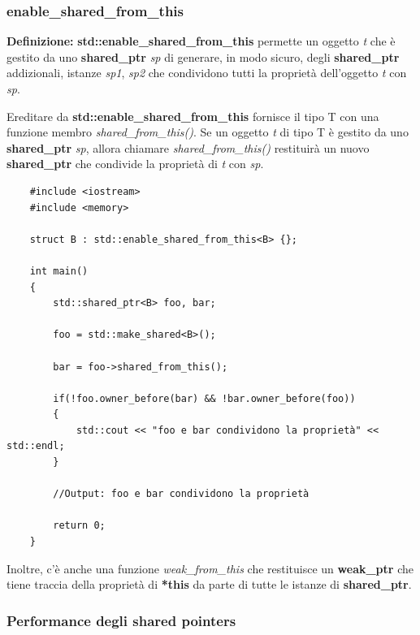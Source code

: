 
\subsubsection{enable\_shared\_from\_this}

\textsf{\small \textbf{Definizione: } \textbf{std::enable\_shared\_from\_this} permette un oggetto \emph{t} che è gestito da uno \textbf{shared\_ptr} \emph{sp} di generare, in modo sicuro, degli \textbf{shared\_ptr} addizionali, istanze \emph{sp1}, \emph{sp2} che condividono tutti la proprietà dell'oggetto \emph{t} con \emph{sp}.} \break

\textsf{\small Ereditare da \textbf{std::enable\_shared\_from\_this} fornisce il tipo T con una funzione membro \emph{shared\_from\_this()}. Se un oggetto \emph{t} di tipo T è gestito da uno \textbf{shared\_ptr} \emph{sp}, allora chiamare \emph{shared\_from\_this()} restituirà un nuovo \textbf{shared\_ptr} che condivide la proprietà di \emph{t} con \emph{sp}. } \\

\begin{lstlisting}
	#include <iostream>
	#include <memory>
	
	struct B : std::enable_shared_from_this<B> {};
	
	int main()
	{
		std::shared_ptr<B> foo, bar;
		
		foo = std::make_shared<B>();
		
		bar = foo->shared_from_this();
		
		if(!foo.owner_before(bar) && !bar.owner_before(foo))
		{
			std::cout << "foo e bar condividono la proprietà" << std::endl;
		}
	
		//Output: foo e bar condividono la proprietà
	
		return 0;
	}
\end{lstlisting}

\textsf{\small Inoltre, c'è anche una funzione \emph{weak\_from\_this} che restituisce un \textbf{weak\_ptr} che tiene traccia della proprietà di \textbf{*this} da parte di tutte le istanze di \textbf{shared\_ptr}.} \\

\subsubsection{Performance degli shared pointers}

